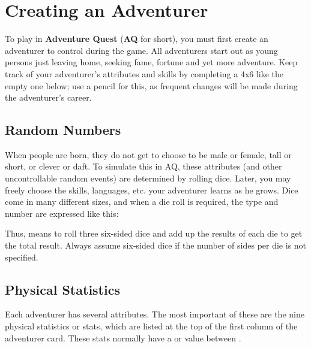 \chapter{Creating an Adventurer}
\label{ch:create-adventurer}
To play in \textbf{Adventure Quest} (\textbf{AQ} for short), you must first create an adventurer to control during the game. All adventurers start out as young persons just leaving home, seeking fame, fortune and yet more adventure. Keep track of your adventurer's attributes and skills by completing a 4x6  like the empty one below; use a pencil for this, as frequent changes will be made during the adventurer's career.

\noindent
\setlength{\columnsep}{\defcolwidth}

\begin{multicols*}{2}
\section{Random Numbers}
When people are born, they do not get to choose to be male or female, tall or short, or clever or daft. To simulate this in AQ, these attributes (and other uncontrollable random events) are determined by rolling dice. Later, you may freely choose the skills, languages, etc. your adventurer learns as he grows. Dice come in many different sizes, and when a die roll is required, the type and number are expressed like this:\\

\begin{nscenter}
\end{nscenter}

Thus,  means to roll three six-sided dice and add up the results of each die to get the total result. Always assume six-sided dice if the number of sides per die is not specified.
\section{Physical Statistics}

Each adventurer has several attributes. The most important of these are the nine physical statistics or stats, which are listed at the top of the first column of the adventurer card. These stats normally have a  or value between .


\end{multicols*}
